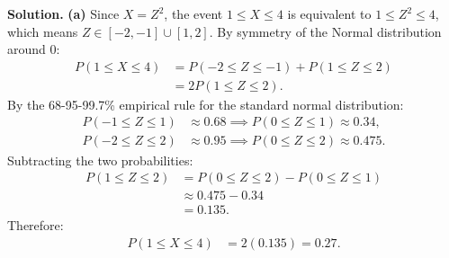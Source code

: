 \documentclass[11pt,a4paper]{article}
\begin{document}
\noindent \textbf{Solution.} \textbf{(a)} Since $X = Z^2$, the event $1 \le X \le 4$ is equivalent to $1 \le Z^2 \le 4$, which means $Z \in [-2, -1] \cup [1, 2]$. By symmetry of the Normal distribution around $0$:
\begin{align*}
P(1 \le X \le 4) &= P(-2 \le Z \le -1) + P(1 \le Z \le 2) \\
&= 2 P(1 \le Z \le 2).
\end{align*}
By the 68-95-99.7\% empirical rule for the standard normal distribution:
\begin{align*}
P(-1 \le Z \le 1) &\approx 0.68 \implies P(0 \le Z \le 1) \approx 0.34, \\
P(-2 \le Z \le 2) &\approx 0.95 \implies P(0 \le Z \le 2) \approx 0.475.
\end{align*}
Subtracting the two probabilities:
\begin{align*}
P(1 \le Z \le 2) &= P(0 \le Z \le 2) - P(0 \le Z \le 1) \\
&\approx 0.475 - 0.34 \\
&= 0.135.
\end{align*}
Therefore:
\begin{align*}
P(1 \le X \le 4) &= 2 (0.135) = 0.27.
\end{align*}
\end{document}

